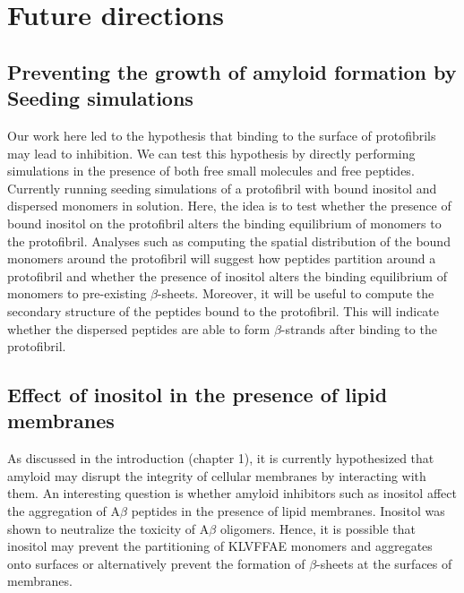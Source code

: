 \section{Future directions}


\subsection{Preventing the growth of amyloid formation by Seeding simulations}
Our work here led to the hypothesis that binding to the surface of protofibrils may lead to inhibition. We can test this hypothesis by directly performing simulations in the presence of both free small molecules and free peptides. Currently running seeding simulations of a protofibril with bound inositol and dispersed monomers in solution. Here, the idea is to test whether the presence of bound inositol on the protofibril alters the binding equilibrium of monomers to the protofibril.
Analyses such as computing the spatial distribution of the bound monomers around the protofibril will suggest how peptides partition around a protofibril and whether the presence of inositol alters the binding equilibrium of monomers to pre-existing $\beta$-sheets. Moreover, it will be useful to compute the secondary structure of the peptides bound to the protofibril.  This will indicate whether the dispersed peptides are able to form $\beta$-strands after binding to the protofibril.

\subsection{Effect of inositol in the presence of lipid membranes}
As discussed in the introduction (chapter 1), it is currently hypothesized that amyloid may disrupt the integrity of cellular membranes by interacting with them. An interesting question is whether amyloid inhibitors such as inositol affect the aggregation of A$\beta$ peptides in the presence of lipid membranes. Inositol was shown to neutralize the toxicity of A$\beta$ oligomers.\cite{McLaurin:2000bq}  Hence, it is possible that inositol may prevent the partitioning of KLVFFAE monomers and aggregates onto surfaces or alternatively prevent the formation of $\beta$-sheets at the surfaces of membranes.\cite{references}

